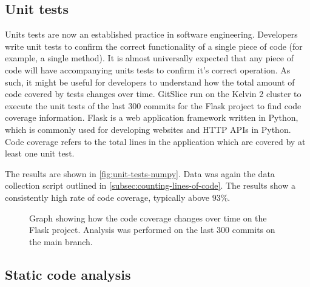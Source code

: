 \subsection{Unit tests}
\label{subsec:unit-tests}

Units tests are now an established practice in software engineering.
Developers write unit tests to confirm the correct functionality of a single piece of code (for example, a single method).
It is almost universally expected that any piece of code will have accompanying units tests to confirm it's correct operation.
As such, it might be useful for developers to understand how the total amount of code covered by tests changes over time.
GitSlice run on the Kelvin 2 cluster to execute the unit tests of the last $ 300 $ commits for the Flask project to find code coverage information.
Flask is a web application framework written in Python, which is commonly used for developing websites and HTTP APIs in Python.
Code coverage refers to the total lines in the application which are covered by at least one unit test.

The results are shown in \autoref{fig:unit-tests-numpy}.
Data was again the data collection script outlined in \autoref{subsec:counting-lines-of-code}.
The results show a consistently high rate of code coverage, typically above $ 93 $\%.

\begin{figure}
    \centering
    \caption{Graph showing how the code coverage changes over time on the Flask project.  Analysis was performed on the last $300$ commits on the main branch.}
    \label{fig:unit-tests-numpy}
\end{figure}



\subsection{Static code analysis}
\label{subsec:static-code-analysis}

